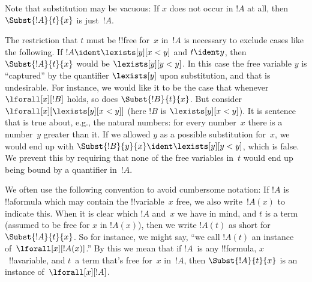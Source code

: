 \documentclass[../../../include/open-logic-section]{subfiles}
\begin{document}
\begin{explain}
Note that substitution may be vacuous: If $x$ does not occur in $!A$
at all, then $\Subst{!A}{t}{x}$ is just~$!A$.

The restriction that $t$ must be !!{free for}~$x$ in~$!A$ is necessary to
exclude cases like the following. If $!A \ident \lexists[y][x < y]$
and $t \ident y$, then $\Subst{!A}{t}{x}$ would be $\lexists[y][y <
  y]$. In this case the free variable $y$ is ``captured'' by the
quantifier $\lexists[y]$ upon substitution, and that is undesirable.
For instance, we would like it to be the case that whenever
$\lforall[x][!B]$ holds, so does $\Subst{!B}{t}{x}$. But consider
$\lforall[x][\lexists[y][x < y]]$ (here $!B$ is $\lexists[y][x <
  y]$). It is sentence that is true about, e.g., the natural numbers:
for every number~$x$ there is a number~$y$ greater than it. If we
allowed $y$ as a possible substitution for~$x$, we would end up with
$\Subst{!B}{y}{x} \ident \lexists[y][y < y]$, which is false. We
prevent this by requiring that none of the free variables in~$t$ would
end up being bound by a quantifier in~$!A$.
\end{explain}

We often use the following convention to avoid cumbersome notation: If
$!A$ is !!a{formula} which may contain the !!{variable}~$x$ free, we
also write~$!A(x)$ to indicate this. When it is clear which $!A$
and~$x$ we have in mind, and $t$ is a term (assumed to be free for $x$
in $!A(x)$), then we write $!A(t)$ as short for $\Subst{!A}{t}{x}$. So
for instance, we might say, ``we call $!A(t)$ an instance
of~$\lforall[x][!A(x)]$.'' By this we mean that if $!A$~is any
!!{formula}, $x$~!!a{variable}, and $t$~a term that's free for~$x$
in~$!A$, then $\Subst{!A}{t}{x}$ is an instance of~$\lforall[x][!A]$.
\end{document}

